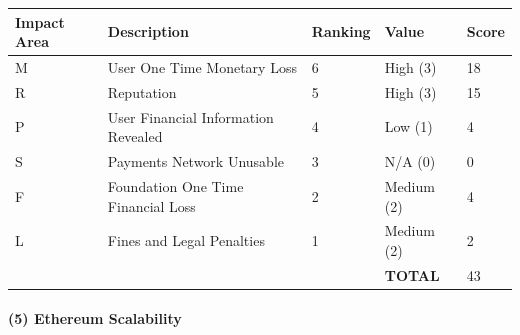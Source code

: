 \documentclass[a4paper,12pt]{article} %
\begin{document}
{\begin{center}
\begin{tabular}{ | l | l | l | l | l |}
  \hline
  \textbf{Impact Area} & \textbf{Description} & \textbf{Ranking} & \textbf{Value} & \textbf{Score}
  \\ \hline
  M & User One Time Monetary Loss			& 6	& High (3)		& 18
  \\ \hline
  R & Reputation		& 5	& High (3)		& 15
  \\ \hline
  P & User Financial Information Revealed		& 4	& Low (1)		& 4
  \\ \hline
  S & Payments Network Unusable					& 3	& N/A (0)		& 0
  \\ \hline
  F & Foundation One Time Financial Loss	& 2	& Medium (2)	& 4
  \\ \hline
  L & Fines and Legal Penalties						& 1	& Medium (2)	& 2
  \\ \hline
  & & & \textbf{TOTAL} & 43
  \\ \hline
\end{tabular}
\end{center}
\label{tab:severityUserIdsStolenFromBackupSystem}

\paragraph{(5) Ethereum Scalability }

}
\end{document}
